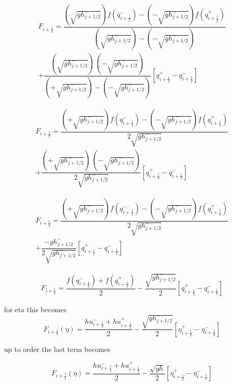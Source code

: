 \documentclass[12pt]{article}
\begin{document}
\begin{multline}
F_{i+\frac{1}{2}} = \dfrac{\left(\sqrt{g h^-_{j + 1/2}}\right) f\left(q^-_{i+\frac{1}{2}}\right) - \left( - \sqrt{g h^-_{j + 1/2}}\right) f\left(q^+_{i+\frac{1}{2}}\right)}{\left(\sqrt{g h^-_{j + 1/2}}\right) - \left( - \sqrt{g h^-_{j + 1/2}}\right)} \\ + \dfrac{\left( \sqrt{g h^-_{j + 1/2}}\right) \, \left( - \sqrt{g h^-_{j + 1/2}}\right)}{\left( + \sqrt{g h^-_{j + 1/2}}\right) - \left( - \sqrt{g h^-_{j + 1/2}}\right)} \left [ q^+_{i+\frac{1}{2}} - q^-_{i+\frac{1}{2}} \right ]
\end{multline}

\begin{multline}
F_{i+\frac{1}{2}} = \dfrac{\left(+ \sqrt{g h^-_{j + 1/2}}\right) f\left(q^-_{i+\frac{1}{2}}\right) - \left( - \sqrt{g h^-_{j + 1/2}}\right) f\left(q^+_{i+\frac{1}{2}}\right)}{ 2\sqrt{g h^-_{j + 1/2}}} \\ + \dfrac{\left( + \sqrt{g h^-_{j + 1/2}}\right) \, \left( - \sqrt{g h^-_{j + 1/2}}\right)}{{ 2\sqrt{g h^-_{j + 1/2}}}} \left [ q^+_{i+\frac{1}{2}} - q^-_{i+\frac{1}{2}} \right ]
\end{multline}

\begin{multline}
F_{i+\frac{1}{2}} = \dfrac{\left(+ \sqrt{g h^-_{j + 1/2}}\right) f\left(q^-_{i+\frac{1}{2}}\right) - \left( - \sqrt{g h^-_{j + 1/2}}\right) f\left(q^+_{i+\frac{1}{2}}\right)}{ 2\sqrt{g h^-_{j + 1/2}}} \\ + \dfrac{ - g h^-_{j + 1/2}}{{ 2\sqrt{g h^-_{j + 1/2}}}} \left [ q^+_{i+\frac{1}{2}} - q^-_{i+\frac{1}{2}} \right ]
\end{multline}

\begin{multline}
F_{i+\frac{1}{2}} = \dfrac{ f\left(q^-_{i+\frac{1}{2}}\right) + f\left(q^+_{i+\frac{1}{2}}\right)}{ 2}  - \dfrac{ \sqrt{g h^-_{j + 1/2}}}{ 2} \left [ q^+_{i+\frac{1}{2}} - q^-_{i+\frac{1}{2}} \right ]
\end{multline}

for eta this becomes
\[F_{i+\frac{1}{2}}(\eta) = \dfrac{ hu^-_{i+\frac{1}{2}}+ hu^+_{i+\frac{1}{2}}}{ 2}  - \dfrac{ \sqrt{g h^-_{j + 1/2}}}{ 2} \left [ \eta^+_{i+\frac{1}{2}} - \eta^-_{i+\frac{1}{2}} \right ]\]

up to order the last term becomes

\[F_{i+\frac{1}{2}}(\eta) = \dfrac{ hu^-_{i+\frac{1}{2}}+ hu^+_{i+\frac{1}{2}}}{ 2}  - \dfrac{ \sqrt{g h}}{ 2} \left [ \eta^+_{i+\frac{1}{2}} - \eta^-_{i+\frac{1}{2}} \right ]\]
\end{document}
